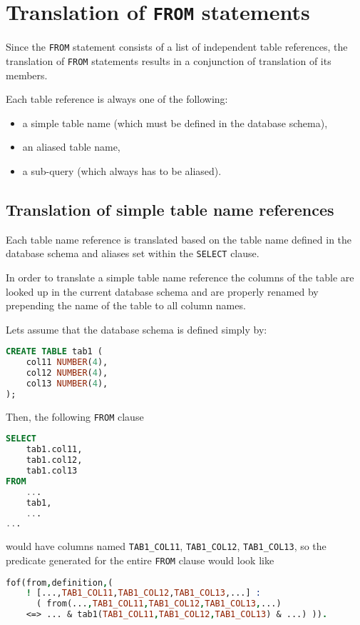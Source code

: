 \documentclass[magisterska,en]{pracamgr}
\newcommand{\code}[1]{\texttt{#1}}
\begin{document}
\section{Translation of \code{FROM} statements}

Since the \code{FROM} statement consists of a list of independent table references, the translation of \code{FROM} statements results in a conjunction of translation of its members.

Each table reference is always one of the following:
\begin{itemize}
    \item a simple table name (which must be defined in the database schema),
    \item an aliased table name,
    \item a sub-query (which always has to be aliased).
\end{itemize}

\subsection{Translation of simple table name references}

Each table name reference is translated based on the table name defined in the database schema and aliases set within the \code{SELECT} clause.


In order to translate a simple table name reference the columns of the table are looked up in the current database schema and are properly renamed by prepending the name of the table to all column names.

Lets assume that the database schema is defined simply by:
\begin{lstlisting}[language=SQL, caption={}]
CREATE TABLE tab1 (
    col11 NUMBER(4),
    col12 NUMBER(4),
    col13 NUMBER(4),
);
\end{lstlisting}

Then, the following \code{FROM} clause

\begin{lstlisting}[language=SQL]
SELECT
    tab1.col11,
    tab1.col12,
    tab1.col13
FROM
    ...
    tab1,
    ...
...
\end{lstlisting}

would have columns named \code{TAB1_COL11}, \code{TAB1_COL12}, \code{TAB1_COL13}, so the predicate generated for the entire \code{FROM} clause would look like

\begin{lstlisting}[language=Prolog]
fof(from,definition,(
    ! [...,TAB1_COL11,TAB1_COL12,TAB1_COL13,...] :
      ( from(...,TAB1_COL11,TAB1_COL12,TAB1_COL13,...)
    <=> ... & tab1(TAB1_COL11,TAB1_COL12,TAB1_COL13) & ...) )).
\end{lstlisting}
\end{document}
